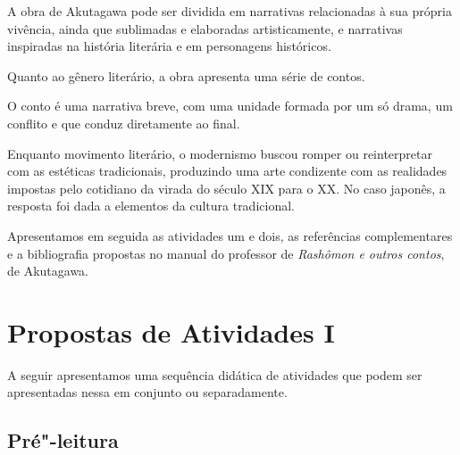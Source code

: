 \documentclass[12pt]{extarticle}
\begin{document}
A obra de Akutagawa pode ser dividida em narrativas relacionadas à sua própria
vivência, ainda que sublimadas e elaboradas artisticamente, e narrativas
inspiradas na história literária e em personagens históricos.
 
Quanto ao gênero literário, a obra apresenta uma série de contos.
 
O conto é uma narrativa breve, com uma unidade formada por um só drama, um
conflito e que conduz diretamente ao final.
 
Enquanto movimento literário, o modernismo buscou romper ou reinterpretar com
as estéticas tradicionais, produzindo uma arte condizente com as realidades
impostas pelo cotidiano da virada do século XIX para o XX.  No caso japonês, a
resposta foi dada a elementos da cultura tradicional.


Apresentamos em seguida as atividades um e dois, as referências complementares
e a bibliografia propostas no manual do professor de \emph{Rashômon e outros contos},
de Akutagawa.

\section{Propostas de Atividades I}

A seguir apresentamos uma sequência didática de atividades que podem ser
apresentadas nessa em conjunto ou separadamente. 

\subsection{Pré"-leitura}
\end{document}
